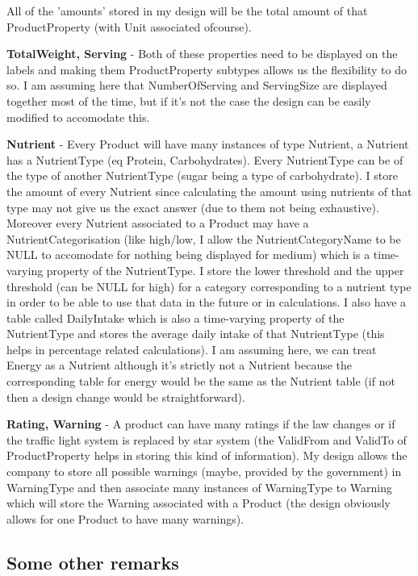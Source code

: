 All of the 'amounts' stored in my design will be the total amount of that ProductProperty (with Unit associated ofcourse).

{\bf TotalWeight, Serving} - Both of these properties need to be displayed on the labels and making them ProductProperty subtypes allows us the flexibility to do so. I am assuming here that NumberOfServing and ServingSize are displayed together most of the time, but if it's not the case the design can be easily modified to accomodate this. 

{\bf Nutrient} - Every Product will have many instances of type Nutrient, a Nutrient has a NutrientType (eq Protein, Carbohydrates). Every NutrientType can be of the type of another NutrientType (sugar being a type of carbohydrate). I store the amount of every Nutrient since calculating the amount using nutrients of that type may not give us the exact answer (due to them not being exhaustive). Moreover every Nutrient associated to a Product may have a NutrientCategorisation (like high/low, I allow the NutrientCategoryName to be NULL to accomodate for nothing being displayed for medium) which is a time-varying property of the NutrientType. I store the lower threshold and the upper threshold (can be NULL for high) for a category corresponding to a nutrient type in order to be able to use that data in the future or in calculations. I also have a table called DailyIntake which is also a time-varying property of the NutrientType and stores the average daily intake of that NutrientType (this helps in percentage related calculations). I am assuming here, we can treat Energy as a Nutrient although it's strictly not a Nutrient because the corresponding table for energy would be the same as the Nutrient table (if not then a design change would be straightforward). 


{\bf Rating, Warning} - A product can have many ratings if the law changes or if the traffic light system is replaced by star system (the ValidFrom and ValidTo of ProductProperty helps in storing this kind of information). My design allows the company to store all possible warnings (maybe, provided by the government) in WarningType and then associate many instances of WarningType to Warning which will store the Warning associated with a Product (the design obviously allows for one Product to have many warnings). 

\subsection{Some other remarks}

